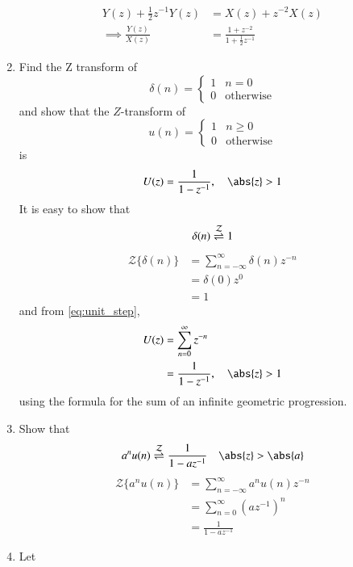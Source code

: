 \documentclass[journal,12pt,twocolumn]{IEEEtran}
\renewcommand\thesection{\arabic{section}}
\begin{document}
\begin{enumerate}[label=\thesection.\arabic*]
\begin{align}
Y(z) + \frac{1}{2}z^{-1}Y(z) &= X(z)+z^{-2}X(z)
\\
\implies \frac{Y(z)}{X(z)} &= \frac{1 + z^{-2}}{1 + \frac{1}{2}z^{-1}}
\label{eq:freq_resp}
\end{align}
%
\item Find the Z transform of 
\begin{equation}
\delta(n)
=
\begin{cases}
1 & n = 0
\\
0 & \text{otherwise}
\end{cases}
\end{equation}
and show that the $Z$-transform of
\begin{equation}
\label{eq:unit_step}
u(n)
=
\begin{cases}
1 & n \ge 0
\\
0 & \text{otherwise}
\end{cases}
\end{equation}
is
\begin{equation}
U(z) = \frac{1}{1-z^{-1}}, \quad \abs{z} > 1
\end{equation}
\solution It is easy to show that
\begin{equation}\label{eq:z_trans_constant}
\delta(n) \overset{\mathcal{Z}}{ \rightleftharpoons} 1
\end{equation}
\begin{align}
    \mathcal {Z}\{\delta(n)\} &=\sum _{n=-\infty }^{\infty }\delta(n)z^{-n}\\
    &= \delta(0)z^0\\
    &=1
\end{align}
and from \eqref{eq:unit_step},
\begin{align}
U(z) &= \sum _{n= 0}^{\infty}z^{-n}
\\
&=\frac{1}{1-z^{-1}}, \quad \abs{z} > 1
\end{align}
using the formula for the sum of an infinite geometric progression.
%
\item Show that 
\begin{equation}
\label{eq:anun}
a^nu(n) \ztrans \frac{1}{1-az^{-1}} \quad \abs{z} > \abs{a}
\end{equation}
\solution
\begin{align}
    \mathcal{Z}\{a^nu(n)\} &= \sum_{n=-\infty}^{\infty} a^nu(n)z^{-n}\\
    &= \sum_{n=0}^{\infty} (az^{-1})^{n}\\
    &= \frac{1}{1-az^{-1}}\label{eq:z_trans_u}
\end{align}
\item 
Let
\begin{equation}

\end{equation}
\end{enumerate}
\end{document}
